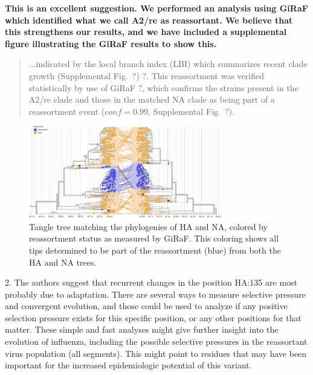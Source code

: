 \documentclass[11pt,oneside,letterpaper]{article}
\begin{document}
\textbf{This is an excellent suggestion. We performed an analysis using GiRaF which identified what we call A2/re as reassortant. We believe that this strengthens our results, and we have included a supplemental figure illustrating the GiRaF results to show this.}

\begin{quotation}
  ...indicated by the local branch index (LBI) which summarizes recent clade growth (Supplemental Fig.~$?$) $?$.
  This reassortment was verified statistically by use of GiRaF $?$, which confirms the strains present in the A2/re clade and those in the matched NA clade as being part of a reassortment event ($conf = 0.99$, Supplemental Fig.~$?$).
\end{quotation}

\begin{figure}[!h]
    \begin{center}
    \includegraphics[width=0.75\textwidth]{../manuscript/in-progress/texfiles/figures/giraf_reassortment_results.png}
    \end{center}
    \caption{Tangle tree matching the phylogenies of HA and NA, colored by reassortment status as measured by GiRaF. This coloring shows all tips determined to be part of the reassortment (blue) from both the HA and NA trees.}
    \label{sup_fig:giraf}
\end{figure}

2. The authors suggest that recurrent changes in the position HA:135 are most probably due to adaptation. There are several ways to measure selective pressure and convergent evolution, and those could be used to analyze if any positive selection pressure exists for this specific position, or any other positions for that matter. These simple and fast analyses might give further insight into the evolution of influenza, including the possible selective pressures in the reassortant virus population (all segments). This might point to residues that may have been important for the increased epidemiologic potential of this variant.\\
\end{document}

